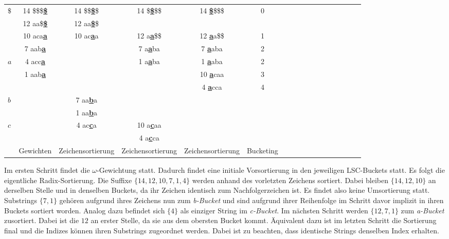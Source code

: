 \begin{center}
  \begin{tabular}{ | l | c | c | c | c | c | c | c | c | c | c | c | c | c | c | c | c | }
    \hline
       $\$$ & 14 \$\$\$\textbf{\underline{\$}} & 14 \$\$\textbf{\underline{\$}}\$ & 14 \$\textbf{\underline{\$}}\$\$ & 14 \textbf{\underline{\$}}\$\$\$ & 0 \\
            & 12 aa\$\textbf{\underline{\$}} & 12 aa\textbf{\underline{\$}}\$ & & & \\ \hline
            & 10 aca\textbf{\underline{a}} & 10 ac\textbf{\underline{a}}a & 12 a\textbf{\underline{a}}\$\$ & 12 \textbf{\underline{a}}a\$\$ & 1 \\
            & 7 aab\textbf{\underline{a}} & & 7 a\textbf{\underline{a}}ba & 7 \textbf{\underline{a}}aba & 2 \\
        $a$ & 4 acc\textbf{\underline{a}} & & 1 a\textbf{\underline{a}}ba & 1 \textbf{\underline{a}}aba & 2  \\
            & 1 aab\textbf{\underline{a}} & & & 10 \textbf{\underline{a}}caa & 3 \\
            & & & & 4 \textbf{\underline{a}}cca & 4  \\ \hline
        $b$ & & 7 aa\textbf{\underline{b}}a & & & \\
            & & 1 aa\textbf{\underline{b}}a & & & \\ \hline
        $c$ & & 4 ac\textbf{\underline{c}}a & 10 a\textbf{\underline{c}}aa & & \\
            & & & 4 a\textbf{\underline{c}}ca & & \\ \hline
            & Gewichten & Zeichensortierung & Zeichensortierung & Zeichensortierung & Bucketing \\
    \hline
  \end{tabular}
\end{center}
\bigskip

\noindent Im ersten Schritt findet die $\omega$-Gewichtung statt. Dadurch findet eine initiale Vorsortierung in den jeweiligen LSC-Buckets statt. Es folgt die eigentliche Radix-Sortierung. Die Suffixe $\{14, 12, 10, 7, 1 , 4\}$ werden anhand des vorletzten Zeichens sortiert. Dabei bleiben $\{14, 12, 10\}$ an derselben Stelle und in denselben Buckets, da ihr Zeichen identisch zum Nachfolgerzeichen ist. Es findet also keine Umsortierung statt. Substrings $\{7, 1\}$ gehören aufgrund ihres Zeichens nun zum \textit{b-Bucket} und sind aufgrund ihrer Reihenfolge im Schritt davor implizit in ihren Buckets sortiert worden. Analog dazu befindet sich $\{4\}$ als einziger String im \textit{c-Bucket}.
Im nächsten Schritt werden $\{12, 7, 1\}$ zum \textit{a-Bucket} zusortiert. Dabei ist die $12$ an erster Stelle, da sie aus dem obersten Bucket kommt. Äquivalent dazu ist im letzten Schritt die Sortierung final und die Indizes können ihren Substrings zugeordnet werden. Dabei ist zu beachten, dass identische Strings denselben Index erhalten.

